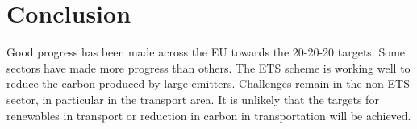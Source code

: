 \documentclass[12pt]{article} %
\begin{document}
\section{Conclusion} %
Good progress has been made across the EU towards the 20-20-20 targets. Some sectors have made more progress than others. The ETS scheme is working well to reduce the carbon produced by large emitters. 
Challenges remain in the non-ETS sector, in particular in the transport area. It is unlikely that the targets for renewables in transport or reduction in carbon in transportation will be achieved.
\printbibliography

\end{document}
